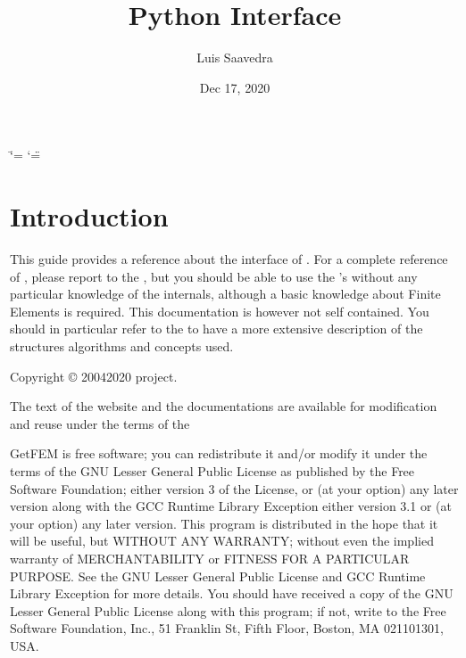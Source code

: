\documentclass[a4paper,11pt,english]{sphinxmanual}
\title{Python Interface}
\date{Dec 17, 2020}
\author{Luis Saavedra}
\begin{document}
\ifdefined\shorthandoff
  \ifnum\catcode`\=\string=\active\shorthandoff{=}\fi
  \ifnum\catcode`\"=\active{}\fi
\fi

\pagestyle{empty}
\sphinxmaketitle
\pagestyle{plain}
\sphinxtableofcontents
\pagestyle{normal}
\label{\detokenize{python/index::doc}}



\chapter{Introduction}
\label{\detokenize{python/intro:introduction}}\label{\detokenize{python/intro:py-intro}}\label{\detokenize{python/intro::doc}}
This guide provides a reference about the  interface of . For a complete
reference of , please report to the , but you should be able
to use the ’s without any particular knowledge of the  internals,
although a basic knowledge about Finite Elements is required. This documentation
is however not self contained. You should in
particular refer to the  to have a more extensive
description of the structures algorithms and concepts used.

Copyright © 2004\sphinxhyphen{}2020  project.

The text of the  website and the documentations are available for modification and reuse under the terms of the 

GetFEM  is  free software;  you  can  redistribute  it  and/or modify it
under  the  terms  of the  GNU  Lesser General Public License as published
by  the  Free Software Foundation;  either version 3 of the License,  or
(at your option) any later version along with the GCC Runtime Library
Exception either version 3.1 or (at your option) any later version.
This program  is  distributed  in  the  hope  that it will be useful,  but
WITHOUT ANY WARRANTY; without even the implied warranty of MERCHANTABILITY
or  FITNESS  FOR  A PARTICULAR PURPOSE.  See the GNU Lesser General Public
License and GCC Runtime Library Exception for more details.
You  should  have received a copy of the GNU Lesser General Public License
along  with  this program;  if not, write to the Free Software Foundation,
Inc., 51 Franklin St, Fifth Floor, Boston, MA  02110\sphinxhyphen{}1301, USA.
\end{document}
